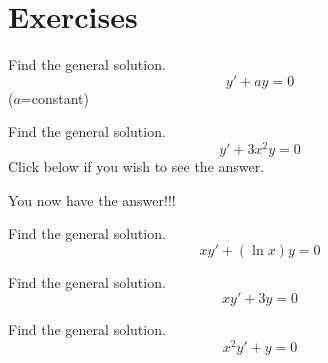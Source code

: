 \documentclass{ximera}
\begin{document}
\begin{example}
\begin{explanation}
 
 
\end{explanation}
 
\end{example}

\section*{Exercises}

\begin{problem}\label{exer:2.1.1} Find the general solution.
$$y'+ay=0$$
($a$=constant)
\end{problem}

\begin{problem}\label{exer:2.1.2} Find the general solution.
   $$y'+3x^2y=0$$ 
Click below if you wish to see the answer.
\begin{expandable}
    You now have the answer!!!
\end{expandable}
\end{problem}


\begin{problem}\label{exer:2.1.3} Find the general solution.
$$xy'+(\ln x)y=0$$
\end{problem}

\begin{problem}\label{exer:2.1.4} Find the general solution.
$$xy'+3y=0$$
\end{problem}

\begin{problem}\label{exer:2.1.5} Find the general solution.
$$x^2y'+y=0$$ 
\end{problem}
\end{document}

